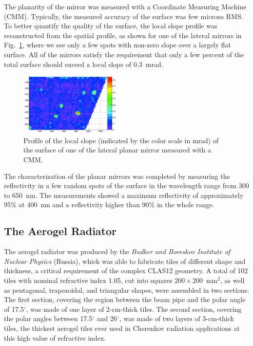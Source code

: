 \documentclass[5p,times,twocolumn]{elsarticle}
\begin{document}
The planarity of the mirror was measured with a Coordinate Measuring Machine (CMM). Typically, the measured
accuracy of the surface was few microns RMS. To better quantify the quality of the surface, the local slope profile
was reconstructed from the spatial profile, as shown for one of the lateral mirrors in Fig.~\ref{Fig:SlopeML}, where
we see only a few spots with non-zero slope over a largely flat surface. All of the mirrors satisfy the requirement that
only a few percent of the total surface should exceed a local slope of 0.3~mrad.

\begin{figure}
\begin{center}
\includegraphics[width=0.45\textwidth]{SlopeML.pdf}
\caption{Profile of the local slope (indicated by the color scale in mrad) of the surface of one of the lateral planar
  mirror measured with a CMM.}
\label{Fig:SlopeML}
\end{center}
\end{figure}

The characterization of the planar mirrors was completed by measuring the reflectivity in a few random spots of
the surface in the wavelength range from 300 to 650~nm. The measurements showed a maximum reflectivity of
approximately 95\% at 400~nm and a reflectivity higher than 90\% in the whole range.

\subsection{The Aerogel Radiator}

The aerogel radiator was produced by the {\it Budker and Boreskov Institute of Nuclear Physics} (Russia), which was
able to fabricate tiles of different shape and thickness, a critical requirement of the complex CLAS12 geometry.
A total of 102 tiles with nominal refractive index 1.05, cut into squares $200 \times 200$~mm$^2$, as well as
pentagonal, trapezoidal, and triangular shapes, were assembled in two sections. The first section, covering the region
between the beam pipe and the polar angle of 17.5$^\circ$, was made of one layer of 2-cm-thick tiles. The second
section, covering the polar angles between 17.5$^\circ$ and 26$^\circ$, was made of two layers of 3-cm-thick tiles, the
thickest aerogel tiles ever used in Cherenkov radiation applications at this high value of refractive index.
\end{document}

